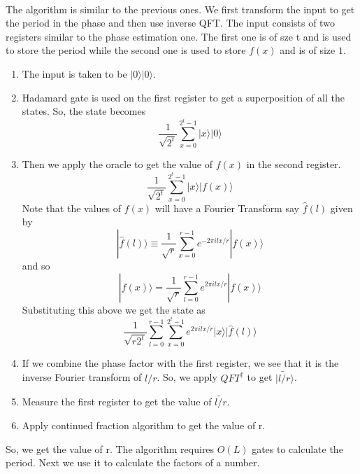 \\The algorithm is similar to the previous ones. We first transform the input to get the period in the phase and then use inverse QFT. The input consists of two registers similar to the phase estimation one. The first one is of sze t and is used to store the period while the second one is used to store $f(x)$ and is of size $1$.
\begin{enumerate}
\item The input is taken to be $|0\rangle |0\rangle$. 
\item Hadamard gate is used on the first register to get a superposition of all the states. So, the state becomes $$ \frac{1}{\sqrt{2^t}} \sum_{x=0}^{2^t -1} |x\rangle |0 \rangle$$
\item Then we apply the oracle to get the value of $f(x)$ in the second register. $$ \frac{1}{\sqrt{2^t}} \sum_{x=0}^{2^t -1} |x\rangle |f(x) \rangle$$ Note that the values of $f(x)$ will have a Fourier Transform say $\hat{f}(l)$ given by \begin{equation}
|\hat{f}(l)\rangle \equiv \frac{1}{\sqrt{r}} \sum_{x=0}^{r-1} e^{-2\pi ilx/r} |f(x)\rangle
\end{equation}and so \begin{equation}
|f(x)\rangle = \frac{1}{\sqrt{r}} \sum_{l=0}^{r-1} e^{2\pi ilx/r} |f(x)\rangle
\end{equation}Substituting this above we get the state as $$\frac{1}{\sqrt{r2^t}} \sum_{l=0}^{r -1} \sum_{x=0}^{2^t -1} e^{2\pi ilx/r} |x\rangle |\hat{f}(l) \rangle$$
\item If we combine the phase factor with the first register, we see that it is the inverse Fourier transform of ${l/r} $. So, we apply $QFT^{\dagger}$ to get $|\widetilde{l/r}\rangle$.
\item Measure the first register to get the value of $\widetilde{l/r}$.
\item Apply continued fraction algorithm to get the value of r.
\end{enumerate}
So, we get the value of r. The algorithm requires $O(L)$ gates to calculate the period. Next we use it to calculate the factors of a number.
\newpage
